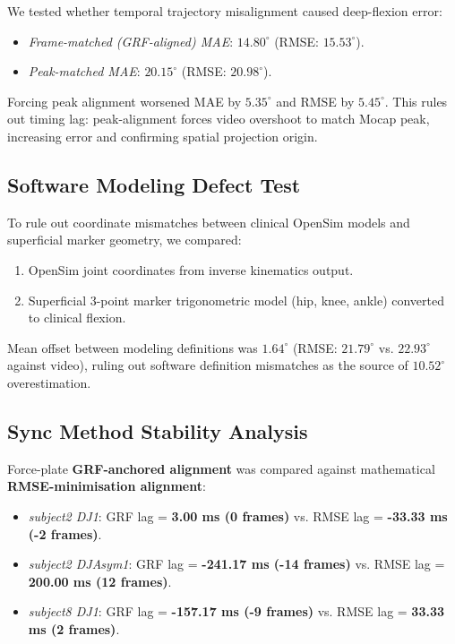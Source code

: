 We tested whether temporal trajectory misalignment caused deep-flexion error:
\begin{itemize}
  \item \textit{Frame-matched (GRF-aligned) MAE}: \textbf{$14.80^\circ$} (RMSE: $15.53^\circ$).
  \item \textit{Peak-matched MAE}: \textbf{$20.15^\circ$} (RMSE: $20.98^\circ$).
\end{itemize}

Forcing peak alignment worsened MAE by $5.35^\circ$ and RMSE by $5.45^\circ$. This rules out timing lag: peak-alignment forces video overshoot to match Mocap peak, increasing error and confirming spatial projection origin.

\subsection{Software Modeling Defect Test}
\label{sec:6-5-2-software-modeling-defect-test}

To rule out coordinate mismatches between clinical OpenSim models and superficial marker geometry, we compared:
\begin{enumerate}
  \item OpenSim joint coordinates from inverse kinematics output.
  \item Superficial 3-point marker trigonometric model (hip, knee, ankle) converted to clinical flexion.
\end{enumerate}

Mean offset between modeling definitions was \textbf{$1.64^\circ$} (RMSE: $21.79^\circ$ vs. $22.93^\circ$ against video), ruling out software definition mismatches as the source of $10.52^\circ$ overestimation.

\subsection{Sync Method Stability Analysis}
\label{sec:6-5-3-sync-method-stability-analysis}

Force-plate \textbf{GRF-anchored alignment} was compared against mathematical \textbf{RMSE-minimisation alignment}:
\begin{itemize}
  \item \textit{subject2 DJ1}: GRF lag = \textbf{3.00 ms (0 frames)} vs. RMSE lag = \textbf{-33.33 ms (-2 frames)}.
  \item \textit{subject2 DJAsym1}: GRF lag = \textbf{-241.17 ms (-14 frames)} vs. RMSE lag = \textbf{200.00 ms (12 frames)}.
  \item \textit{subject8 DJ1}: GRF lag = \textbf{-157.17 ms (-9 frames)} vs. RMSE lag = \textbf{33.33 ms (2 frames)}.
\end{itemize}

